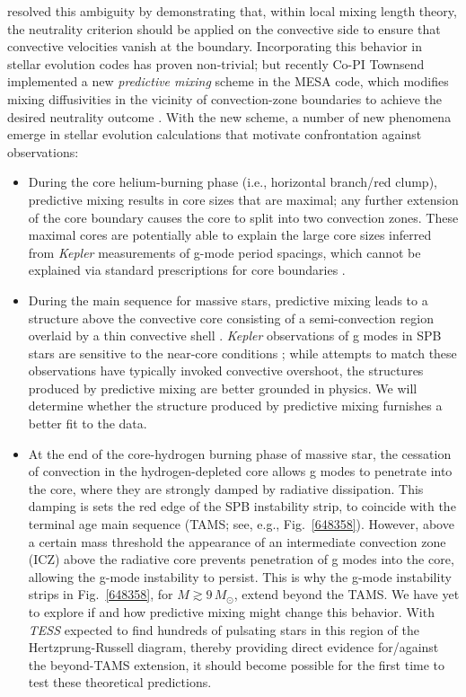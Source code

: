 \citet{Gabriel:2014} resolved this ambiguity by demonstrating that, within local mixing length theory, the neutrality criterion should be applied on the convective side to ensure that convective velocities vanish at the boundary. Incorporating this behavior in stellar evolution codes has proven non-trivial; but recently Co-PI Townsend implemented a new \emph{predictive mixing} scheme in the MESA code, which modifies mixing diffusivities in the vicinity of convection-zone boundaries to achieve the desired neutrality outcome \citep[see][]{Paxton:2017}. With the new scheme, a number of new phenomena emerge in stellar evolution calculations that motivate confrontation against observations:
\begin{itemize}
\item During the core helium-burning phase (i.e., horizontal branch/red clump), predictive mixing results in core sizes that are maximal; any further extension of the core boundary causes the core to split into two convection zones. These maximal cores are potentially able to explain the large core sizes inferred from \emph{Kepler} measurements of g-mode period spacings, which cannot be explained via standard prescriptions for core boundaries \citep[e.g.,][and reference therein]{Constantino:2015}.
\item During the main sequence for massive stars, predictive mixing leads to a structure above the convective core consisting of a semi-convection region overlaid by a thin convective shell \citep[see, e.g., the right-hand panel in Fig.~4 of][]{Paxton:2017}. \emph{Kepler} observations of g modes in SPB stars are sensitive to the near-core conditions \citep[e.g.,][]{Moravveji:2015}; while attempts to match these observations have typically invoked convective overshoot, the structures produced by predictive mixing are better grounded in physics. We will determine whether the structure produced by predictive mixing furnishes a better fit to the data.

\item At the end of the core-hydrogen burning phase of massive star, the cessation of convection in the hydrogen-depleted core allows g modes to penetrate into the core, where they are strongly damped by radiative dissipation. This damping is sets the red edge of the SPB instability strip, to coincide with the terminal age main sequence (TAMS; see, e.g., Fig.~\ref{648358}). However, above a certain mass threshold the appearance of an intermediate convection zone (ICZ) above the radiative core prevents penetration of g modes into the core, allowing the g-mode instability to persist. This is why the g-mode instability strips in Fig.~\ref{648358}, for $M \gtrsim 9\,M_{\odot}$, extend beyond the TAMS. We have yet to explore if and how predictive mixing might change this behavior. With \emph{TESS} expected to find hundreds of pulsating stars in this region of the Hertzprung-Russell diagram, thereby providing direct evidence for/against the beyond-TAMS extension, it should become possible for the first time to test these theoretical predictions.
\end{itemize}